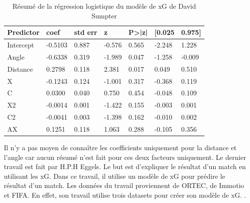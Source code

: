 \documentclass[12pt]{article}
\begin{document}
\begin{table}[htp]
    \centering
    \begin{tabular}{|l|l|l|l|l|l|l|}
    \hline
    \textbf{Predictor} & \textbf{coef} & \textbf{std err} & \textbf{z} & \textbf{P\textgreater{}|z|} & \textbf{{[}0.025} & \textbf{0.975{]}} \\ \hline
    Intercept          & -0.5103       & 0.887            & -0.576     & 0.565                       & -2.248            & 1.228             \\ \hline
    Angle              & -0.6338       & 0.319            & -1.989     & 0.047                       & -1.258            & -0.009            \\ \hline
    Distance           & 0.2798        & 0.118            & 2.381      & 0.017                       & 0.049             & 0.510             \\ \hline
    X                  & -0.1243       & 0.124            & -1.001     & 0.317                       & -0.368            & 0.119             \\ \hline
    C                  & 0.0300        & 0.040            & 0.750      & 0.454                       & -0.048            & 0.109             \\ \hline
    X2                 & -0.0014       & 0.001            & -1.422     & 0.155                       & -0.003            & 0.001             \\ \hline
    C2                 & -0.0041       & 0.003            & -1.398     & 0.162                       & -0.010            & 0.002             \\ \hline
    AX                 & 0.1251        & 0.118            & 1.063      & 0.288                       & -0.105            & 0.356             \\ \hline
    \end{tabular}
    \caption{Résumé de la régression logistique du modèle de xG de David Sumpter}
\end{table}
\noindent Il n'y a pas moyen de connaître les coefficients uniquement pour la distance et l'angle car aucun résumé n'est fait pour ces deux facteurs uniquement.
\newline\newline
Le dernier travail est fait par H.P.H Eggels. 
Le but est d'expliquer le résultat d'un match en utilisant les xG. 
Dans ce travail, il utilise un modèle de xG pour prédire le résultat d'un match.
Les données du travail proviennent de ORTEC, de Immotio et FIFA. En effet, son travail utilise trois datasets pour créer son modèle de xG. \cite{eggelsExpectedGoalsSoccer2016}.
\end{document}

